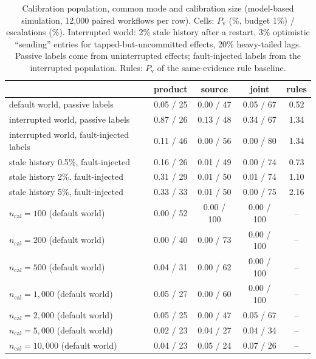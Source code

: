 \begin{table}[t]
\centering
\caption{Calibration population, common mode and calibration size (model-based simulation, 12{,}000 paired workflows per row). Cells: $P_{\mathrm{v}}$ (\%, budget 1\%) /
escalations (\%). Interrupted world: 2\% stale history after a restart, 3\% optimistic ``sending'' entries for tapped-but-uncommitted effects, 20\% heavy-tailed lags.
Passive labels come from uninterrupted effects; fault-injected labels from the interrupted population. Rules: $P_{\mathrm{v}}$ of the same-evidence rule baseline.}
\label{tab:pop}
\footnotesize
\setlength{\tabcolsep}{2pt}
\begin{tabular}{@{}l ccc c@{}}
\toprule
 & product & source & joint & rules \\
\midrule
default world, passive labels & 0.05 / 25 & 0.00 / 47 & 0.05 / 67 & 0.52 \\
interrupted world, passive labels & 0.87 / 26 & 0.13 / 48 & 0.34 / 67 & 1.34 \\
interrupted world, fault-injected labels & 0.11 / 46 & 0.00 / 56 & 0.00 / 80 & 1.34 \\
stale history 0.5\%, fault-injected & 0.16 / 26 & 0.01 / 49 & 0.00 / 74 & 0.73 \\
stale history 2\%, fault-injected & 0.31 / 29 & 0.01 / 50 & 0.01 / 74 & 1.10 \\
stale history 5\%, fault-injected & 0.33 / 33 & 0.01 / 50 & 0.00 / 75 & 2.16 \\
\midrule
$n_{\mathrm{cal}}{=}100$ (default world) & 0.00 / 52 & 0.00 / 100 & 0.00 / 100 & -- \\
$n_{\mathrm{cal}}{=}200$ (default world) & 0.00 / 40 & 0.00 / 73 & 0.00 / 100 & -- \\
$n_{\mathrm{cal}}{=}500$ (default world) & 0.04 / 31 & 0.00 / 62 & 0.00 / 100 & -- \\
$n_{\mathrm{cal}}{=}1{,}000$ (default world) & 0.05 / 27 & 0.00 / 60 & 0.00 / 100 & -- \\
$n_{\mathrm{cal}}{=}2{,}000$ (default world) & 0.05 / 25 & 0.00 / 47 & 0.05 / 67 & -- \\
$n_{\mathrm{cal}}{=}5{,}000$ (default world) & 0.02 / 23 & 0.04 / 27 & 0.04 / 34 & -- \\
$n_{\mathrm{cal}}{=}10{,}000$ (default world) & 0.04 / 23 & 0.05 / 24 & 0.07 / 26 & -- \\
\bottomrule
\end{tabular}
\end{table}
